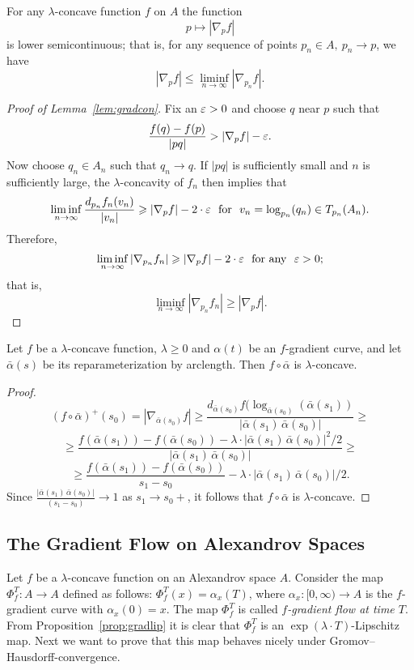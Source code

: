 \documentclass{amsart}
\begin{document}
\begin{cor}\label{cor:gradlim} 
For any $\lambda$-concave function $f$ on $A$
the function 
$$p\mapsto|\nabla_pf|$$ 
is lower semicontinuous;
that is, for any sequence of points $p_n\in A,\  p_n\to p$, we have
$$|\nabla_p f|\le \liminf_{n\to \infty} |\nabla_{p_n} f|.$$

\end{cor}

\begin{proof}[Proof of Lemma~\ref{lem:gradcon}] Fix an $\varepsilon>0$ and choose $q$ near $p$ such
that
$$\frac{f(q)-f(p)}{|pq|}> |\nabla_p f|-\varepsilon.$$
Now choose $q_n\in A_n$ such that $q_n\to q$.
If $|pq|$ is sufficiently small and $n$ is
sufficiently large,  the $\lambda$-concavity of $f_n$ then implies that
$$\liminf_{n\to \infty}\frac{d_{p_n}f_n(v_n)}{|v_n|}\ge |\nabla_p f|-2\cdot \eps \ \ \text{for}\ \  v_n=
\log_{p_n}(q_n)\in T_{p_n}(A_n).$$
Therefore,
$$\liminf_{n\to \infty} |\nabla_{p_n} f_n|\geqslant
|\nabla_p f|-2\cdot \varepsilon \ \ \text{for any}\ \ \varepsilon>0;$$
that is,
$$\liminf_{n\to \infty} |\nabla_{p_n} f_n|\ge
|\nabla_p f|. $$
\end{proof}

\begin{lem}\label{lem:concave}Let $f$ be a $\lambda$-concave function,  $\lambda\ge 0$ and $\alpha(t)$ be an $f$-gradient curve, and let $\bar\alpha(s)$ be its reparameterization by arclength. Then $f\circ\bar\alpha$ is  $\lambda$-concave.
\end{lem}

\begin{proof}

$$(f\circ\bar\alpha)^+(s_0)=|\nabla_{\bar\alpha(s_0)}f|
\ge
 \frac{d_{\bar\alpha(s_0)}f(\log_{\bar\alpha(s_0)}(\bar\alpha(s_1))}
 { |\bar\alpha(s_1)\,\bar\alpha(s_0)|}
 \ge$$
$$
\ge\frac{f(\bar\alpha(s_1))-f(\bar\alpha(s_0))
-
\lambda\cdot  |\bar\alpha(s_1)\,\bar\alpha(s_0)|^2/2 }{|\bar\alpha(s_1)\,\bar\alpha(s_0)|}
\ge $$
$$\ge
\frac{f(\bar\alpha(s_1))-f(\bar\alpha(s_0))}{ s_1-s_0}
-
\lambda\cdot |\bar\alpha(s_1)\,\bar\alpha(s_0)|/2.$$
Since $\frac{|\bar\alpha(s_1)\,\bar\alpha(s_0)|}{(s_1-s_0)}\to 1$
 as $s_1\to s_0+$, it follows that $f\circ\bar\alpha$ is  $\lambda$-concave.

\end{proof}





\subsection{ The Gradient Flow on Alexandrov Spaces}
Let $f$ be a $\lambda$-concave function on an Alexandrov space $A$.
Consider the map $\Phi_f^T\colon A\to A$ defined as follows:
$\Phi_f^T(x)=\alpha_x(T)$, where $\alpha_x\colon [0,\infty)\to A$ is the $f$-gradient curve with $\alpha_x(0)=x$.
The map $\Phi_f^T$ is called
\emph{$f$-gradient flow at time $T$}. From Proposition~\ref{prop:gradlip}  it is clear that  $\Phi_f^T$ is an $\exp(\lambda\cdot  T)$-Lipschitz map. Next we want to prove that this map behaves nicely under Gromov--Hausdorff-convergence.
\end{document}

